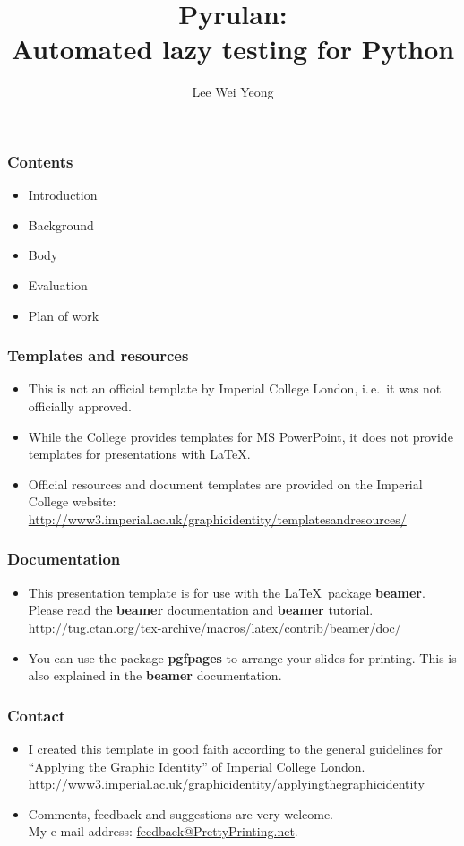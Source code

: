 \documentclass[t]{beamer}
\author{Lee Wei Yeong}
\title[lwy08@doc.ic.ac.uk]{Pyrulan:\\Automated lazy testing for Python}
\begin{document}
\frame{\maketitle}
\begin{frame}
\frametitle{Contents}
	\begin{itemize}
	\item Introduction
	\item Background
	\item Body
	\item Evaluation
	\item Plan of work
	\end{itemize}
\end{frame}
\begin{frame}
\frametitle{Templates and resources}
	\begin{itemize}
	\item This is not an official template by Imperial 
	College London,
	i.\,e.\ it was not officially approved.
	\item While the College provides templates for 
	MS PowerPoint, it does not provide templates 
	for presentations with \LaTeX. 
	\item Official resources and document 
	templates are provided on the Imperial 
	College website:\\	
	\url{
http://www3.imperial.ac.uk/graphicidentity/templatesandresources/ }
	\end{itemize}
\end{frame}

\begin{frame}
\frametitle{Documentation}
	\begin{itemize}
	\item This presentation template is for use 
	with the \LaTeX\ package \textbf{beamer}.
	Please read the \textbf{beamer} documentation 
	and  \textbf{beamer} tutorial.\\	
\url{
http://tug.ctan.org/tex-archive/macros/latex/contrib/beamer/doc/}
	\item You can use the package \textbf{pgfpages} 
	to arrange your slides for printing. This is also explained
	in the \textbf{beamer} documentation.
	\end{itemize}
\end{frame}

\begin{frame}
\frametitle{Contact}
	\begin{itemize}
	\item I created this template in good faith according
	to the general guidelines for ``Applying the Graphic
	Identity'' of Imperial College London.\\	
\url{
http://www3.imperial.ac.uk/graphicidentity/applyingthegraphicidentity}
	\item Comments, feedback and suggestions are very welcome.\\
	My e-mail address:
	\href{mailto:feedback@prettyprinting.net}{feedback@PrettyPrinting.net}.
	\end{itemize}
\end{frame} 
\end{document}
